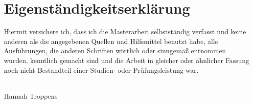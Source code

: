 \newpage

\section*{Eigenständigkeitserklärung}




Hiermit versichere ich, dass ich die Masterarbeit selbstständig verfasst und keine anderen als die angegebenen Quellen und Hilfsmittel benutzt habe, alle Ausführungen, die anderen Schriften wörtlich oder sinngemäß entnommen wurden, kenntlich gemacht sind und die Arbeit in gleicher oder ähnlicher Fassung noch nicht Bestandteil einer Studien- oder Prüfungsleistung war.


\vspace{100mm}
    

\begin{otherlanguage}{ngerman}
\myformat{\today}
\end{otherlanguage}
\begin{minipage}[t]{8cm} 
\centering \hspace{20mm} \hrulefill \\
\hspace{20mm} Hannah Troppens
\end{minipage}
